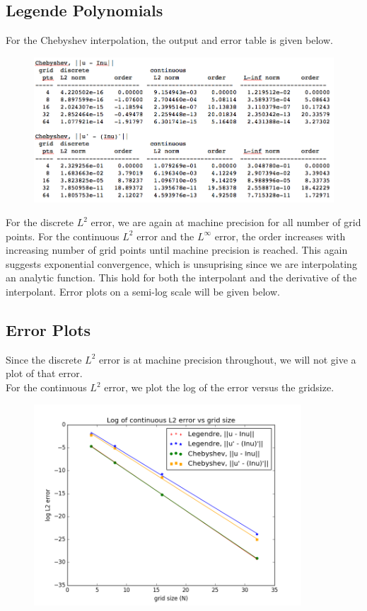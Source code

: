 \documentclass[12pt]{article}
\begin{document}
\subsection*{Legende Polynomials}
For the Chebyshev interpolation, the output and error table is given below.

\begin{figure}[H]
\includegraphics[width=12cm]{images/chebyshev.png}
\end{figure}

For the discrete $L^2$ error, we are again at machine precision for all number of grid points. For the continuous $L^2$ error and the $L^\infty$ error, the order increases with increasing number of grid points until machine precision is reached. This again suggests exponential convergence, which is unsuprising since we are interpolating an analytic function. This hold for both the interpolant and the derivative of the interpolant. Error plots on a semi-log scale will be given below.

\subsection*{Error Plots}

Since the discrete $L^2$ error is at machine precision throughout, we will not give a plot of that error.\\

For the continuous $L^2$ error, we plot the log of the error versus the gridsize. 

\begin{figure}[H]
\includegraphics[width=10cm]{images/polyL2error.png}
\end{figure}
\end{document}
